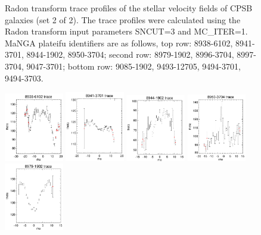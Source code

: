 \documentclass[fleqn,usenatbib]{mnras}
\begin{document}
\begin{figure}
    \caption{Radon transform trace profiles of the stellar velocity fields of CPSB galaxies (set 2 of 2). The trace profiles were calculated using the Radon transform input parameters SNCUT=3 and MC\_ITER=1.  MaNGA plateifu identifiers are as follows, top row: 8938-6102, 8941-3701, 8944-1902, 8950-3704; second row: 8979-1902, 8996-3704, 8997-3704, 9047-3701; bottom row: 9085-1902, 9493-12705, 9494-3701, 9494-3703.}
    \label{fig:Radon-traces-CPSBs-2}
\end{figure}

\begin{figure}
    \centering
    \includegraphics[width=0.23\textwidth]{Images/SN1-MC250/CPSBs/8938-6102-1-250.png}
    \includegraphics[width=0.23\textwidth]{Images/SN1-MC250/CPSBs/8941-3701-1-250.png}
    \includegraphics[width=0.23\textwidth]{Images/SN1-MC250/CPSBs/8944-1902-1-250.png}
    \includegraphics[width=0.23\textwidth]{Images/SN1-MC250/CPSBs/8950-3704-1-250.png}
    \includegraphics[width=0.23\textwidth]{Images/SN1-MC250/CPSBs/8979-1902-1-250.png}

\end{figure}
\end{document}
